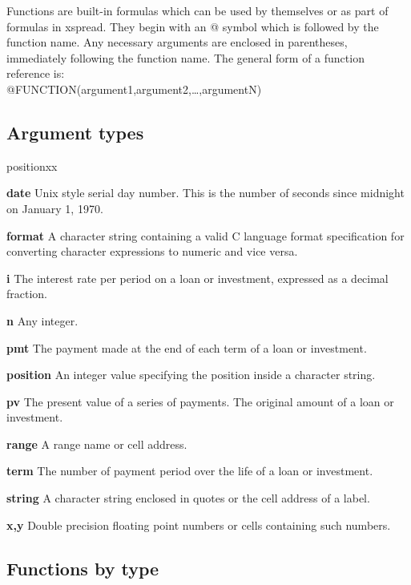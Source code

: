     Functions are built-in formulas which can be used by themselves or as part 
of formulas in xspread.  They begin with an @ symbol which is followed by the 
function name.  Any necessary arguments are enclosed in parentheses, 
immediately following the function name.  The general form of a function 
reference is:\\
@FUNCTION(argument1,argument2,\ldots ,argumentN)

\subsection*{Argument types}

\begin{namelist}{positionxx}
\item[{\bf date}]{Unix style serial day number.  This is the number of
                  seconds since midnight on January 1, 1970.}
\item[{\bf format}]{A character string containing a valid C language
                   format specification for converting character
                   expressions to numeric and vice versa.}
\item[{\bf i}]{The interest rate per period on a loan or investment,
                expressed as a decimal fraction.}
\item[{\bf n }]{Any integer.}
\item[{\bf pmt }]{The payment made at the end of each term of a loan or
                investment.}
\item[{\bf position }]{An integer value specifying the position inside a
                        character string.}
\item[{\bf pv  }]{The present value of a series of payments.  The original
                amount of a loan or investment.}
\item[{\bf range }]{A range name or cell address.}
\item[{\bf term }]{The number of payment period over the life of a loan or
                investment.}
\item[{\bf string  }]{A character string enclosed in quotes or the cell address
                of a label.}
\item[{\bf x,y}]{Double precision floating point numbers or cells containing
such numbers.}
\end{namelist}

\subsection*{Functions by type}

